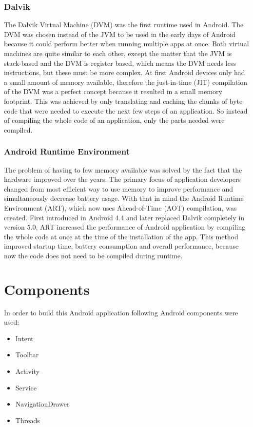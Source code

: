     \subsubsection{Dalvik}
    The Dalvik Virtual Machine (DVM) was the first runtime used in Android. The DVM was chosen instead of the JVM to be used in the early days of Android because it could perform better when running multiple apps at once. Both virtual machines are quite similar to each other, except the matter that the JVM is stack-based and the DVM is register based, which means the DVM needs less instructions, but these must be more complex. At first Android devices only had a small amount of memory available, therefore the just-in-time (JIT) compilation of the DVM was a perfect concept because it resulted in a small memory footprint. This was achieved by only translating and caching the chunks of byte code that were needed to execute the next few steps of an application. So instead of compiling the whole code of an application, only the parts needed were compiled.

    \subsubsection{Android Runtime Environment}
    The problem of having to few memory available was solved by the fact that the hardware improved over the years. The primary focus of application developers changed from most efficient way to use memory to improve performance and simultaneously decrease battery usage. With that in mind the Android Runtime Environment (ART), which now uses Ahead-of-Time (AOT) compilation, was created. First introduced in Android 4.4 and later replaced Dalvik completely in version 5.0, ART increased the performance of Android application by compiling the whole code at once at the time of the installation of the app. This method improved startup time, battery consumption and overall performance, because now the code does not need to be compiled during runtime.

\section{Components}
In order to build this Android application following Android components were used:

\begin{itemize}
    \item Intent
    \item Toolbar
    \item Activity
    \item Service
    \item NavigationDrawer
    \item Threads
\end{itemize}

